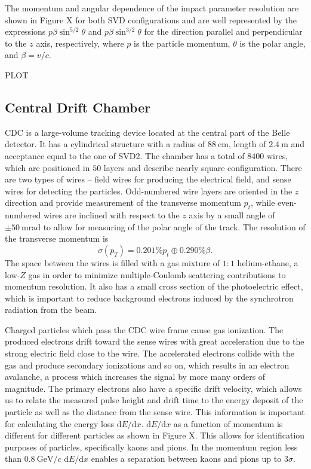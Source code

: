 \documentclass[headings=standardclasses,headings=big,oneside,a4paper,openany,12pt]{scrbook}
\newcommand {\e}[1]{\mathrm{~#1}}
\begin{document}
The momentum and angular dependence of the impact parameter resolution are shown in Figure X for both SVD configurations and are well represented by the expressions $p\beta \sin^{5/2}\theta$ and $p\beta \sin^{3/2}\theta$ for the direction parallel and perpendicular to the $z$ axis, respectively, where $p$ is the particle momentum, $\theta$ is the polar angle, and $\beta=v/c$.

PLOT


\subsection{Central Drift Chamber}

CDC is a large-volume tracking device located at the central part of the Belle detector. It has a cylindrical structure with a radius of $88\e{cm}$, length of $2.4\e{m}$ and acceptance equal to the one of SVD2. The chamber has a total of $8400$ wires, which are positioned in $50$ layers and describe nearly square configuration. There are two types of wires -- field wires for producing the electrical field, and sense wires for detecting the particles. Odd-numbered wire layers are oriented in the $z$ direction and provide measurement of the transverse momentum $p_t$, while even-numbered wires are inclined with respect to the $z$ axis by a small angle of $\pm 50\e{mrad}$ to allow for measuring of the polar angle of the track. The resolution of the transverse momentum is
$$\sigma(p_T) = 0.201\%p_t \oplus 0.290\%\beta.$$
The space between the wires is filled with a gas mixture of $1:1$ helium-ethane, a low-$Z$ gas in order to minimize multiple-Coulomb scattering contributions to momentum resolution. It also has a small cross section of the photoelectric effect, which is important to reduce background electrons induced by the synchrotron radiation from the beam.

Charged particles which pass the CDC wire frame cause gas ionization. The produced electrons drift toward the sense wires with great acceleration due to the strong electric field close to the wire. The accelerated electrons collide with the gas and produce secondary ionizations and so on, which results in an electron avalanche, a process which increases the signal by more many orders of magnitude. The primary electrons also have a specific drift velocity, which allows us to relate the measured pulse height and drift time to the energy deposit of the particle as well as the distance from the sense wire. This information is important for calculating the energy loss $\mathrm{d}E/\mathrm{d}x$. $\mathrm{d}E/\mathrm{d}x$ as a function of momentum is different for different particles as shown in Figure X. This allows for identification purposes of particles, specifically kaons and pions. In the momentum region less than $0.8\e{GeV}/c$ $\mathrm{d}E/\mathrm{d}x$ enables a separation between kaons and pions up to $3\sigma$.
\end{document}
